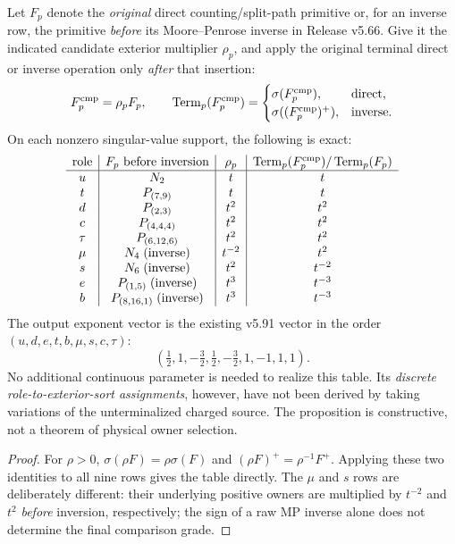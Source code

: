 \documentclass[11pt,a4paper]{article}
\begin{document}
\begin{proposition}
\label{p6:prop:v5124-constructive-preterminal-words}
Let $F_p$ denote the \emph{original} direct counting/split-path
primitive or, for an inverse row, the primitive \emph{before}
its Moore--Penrose inverse in Release v5.66.  Give it the indicated
candidate exterior multiplier $\rho_p$, and apply the original
terminal direct or inverse operation only \emph{after} that insertion:
\[
 F_p^{\rm cmp}=\rho_pF_p,\qquad
 \operatorname{Term}_p(F_p^{\rm cmp})
 =\begin{cases}\sigma(F_p^{\rm cmp}),&\text{direct},\\
 \sigma((F_p^{\rm cmp})^+),&\text{inverse}.
 \end{cases}
\]
On each nonzero singular-value support, the following is exact:
\[
\begin{array}{c|c|c|c}
\text{role}&F_p\text{ before inversion}&\rho_p&
\operatorname{Term}_p(F_p^{\rm cmp})/\operatorname{Term}_p(F_p)\\\hline
u&N_2&t&t\\
t&P_{(7,9)}&t&t\\
d&P_{(2,3)}&t^2&t^2\\
c&P_{(4,4,4)}&t^2&t^2\\
\tau&P_{(6,12,6)}&t^2&t^2\\
\mu&N_4\;(\text{inverse})&t^{-2}&t^2\\
s&N_6\;(\text{inverse})&t^2&t^{-2}\\
e&P_{(1,5)}\;(\text{inverse})&t^3&t^{-3}\\
b&P_{(8,16,1)}\;(\text{inverse})&t^3&t^{-3}
\end{array}
\]
The output exponent vector is the existing v5.91 vector in the
order $(u,d,e,t,b,\mu,s,c,\tau)$:
\[
 \boxed{(\tfrac12,1,-\tfrac32,\tfrac12,-\tfrac32,1,-1,1,1).}
\]
No additional continuous parameter is needed to realize this table.
Its \emph{discrete role-to-exterior-sort assignments}, however, have
not been derived by taking variations of the unterminalized charged
source.  The proposition is constructive, not a theorem of physical
owner selection.
\end{proposition}
\begin{proof}
For $\rho>0$, $\sigma(\rho F)=\rho\sigma(F)$ and
$(\rho F)^+=\rho^{-1}F^+$.  Applying these two identities to
all nine rows gives the table directly.  The $\mu$ and $s$ rows
are deliberately different: their underlying positive owners are
multiplied by $t^{-2}$ and $t^2$ \emph{before} inversion,
respectively; the sign of a raw MP inverse alone does not determine
the final comparison grade.
\end{proof}
\end{document}
